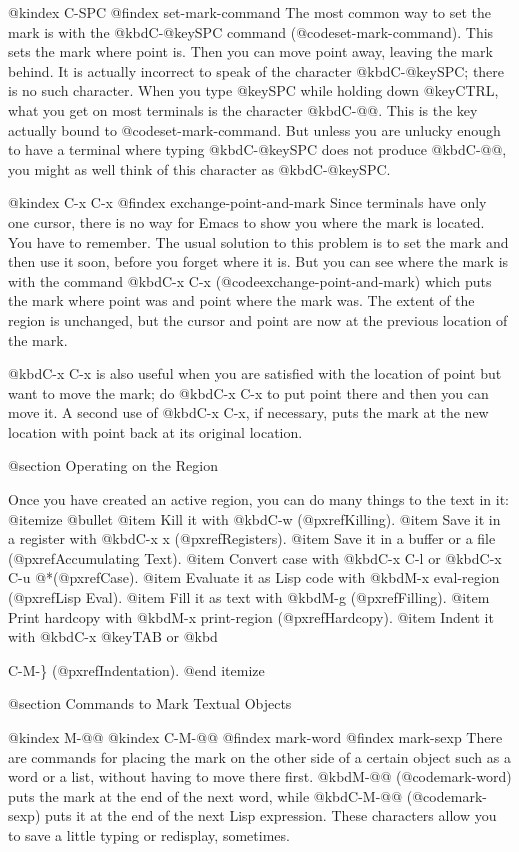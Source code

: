 {{{{{@kindex C-SPC
@findex set-mark-command
  The most common way to set the mark is with the @kbd{C-@key{SPC}} command
(@code{set-mark-command}).  This sets the mark where point is.  Then you
can move point away, leaving the mark behind.  It is actually incorrect to
speak of the character @kbd{C-@key{SPC}}; there is no such character.  When
you type @key{SPC} while holding down @key{CTRL}, what you get on most
terminals is the character @kbd{C-@@}.  This is the key actually bound to
@code{set-mark-command}.  But unless you are unlucky enough to have a
terminal where typing @kbd{C-@key{SPC}} does not produce @kbd{C-@@}, you
might as well think of this character as @kbd{C-@key{SPC}}.

@kindex C-x C-x
@findex exchange-point-and-mark
  Since terminals have only one cursor, there is no way for Emacs to show
you where the mark is located.  You have to remember.  The usual solution
to this problem is to set the mark and then use it soon, before you forget
where it is.  But you can see where the mark is with the command @kbd{C-x
C-x} (@code{exchange-point-and-mark}) which puts the mark where point was and
point where the mark was.  The extent of the region is unchanged, but the
cursor and point are now at the previous location of the mark.

  @kbd{C-x C-x} is also useful when you are satisfied with the location of
point but want to move the mark; do @kbd{C-x C-x} to put point there and
then you can move it.  A second use of @kbd{C-x C-x}, if necessary, puts
the mark at the new location with point back at its original location.

@section Operating on the Region

  Once you have created an active region, you can do many things to
the text in it:
@itemize @bullet
@item
Kill it with @kbd{C-w} (@pxref{Killing}).
@item
Save it in a register with @kbd{C-x x} (@pxref{Registers}).
@item
Save it in a buffer or a file (@pxref{Accumulating Text}).
@item
Convert case with @kbd{C-x C-l} or @kbd{C-x C-u} @*(@pxref{Case}).
@item
Evaluate it as Lisp code with @kbd{M-x eval-region} (@pxref{Lisp Eval}).
@item
Fill it as text with @kbd{M-g} (@pxref{Filling}).
@item
Print hardcopy with @kbd{M-x print-region} (@pxref{Hardcopy}).
@item
Indent it with @kbd{C-x @key{TAB}} or @kbd{C-M-\} (@pxref{Indentation}).
@end itemize

@section Commands to Mark Textual Objects

@kindex M-@@
@kindex C-M-@@
@findex mark-word
@findex mark-sexp
  There are commands for placing the mark on the other side of a certain
object such as a word or a list, without having to move there first.
@kbd{M-@@} (@code{mark-word}) puts the mark at the end of the next word,
while @kbd{C-M-@@} (@code{mark-sexp}) puts it at the end of the next Lisp
expression.  These characters allow you to save a little typing or
redisplay, sometimes.

}}}}}}
